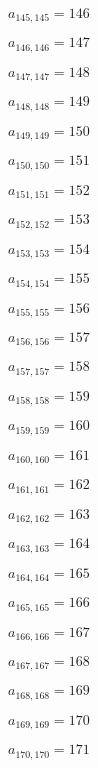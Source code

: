 \documentclass[a4paper,12pt]{article}
\begin{document}
$a _{ 145, 145 } = 146$

$a _{ 146, 146 } = 147$

$a _{ 147, 147 } = 148$

$a _{ 148, 148 } = 149$

$a _{ 149, 149 } = 150$

$a _{ 150, 150 } = 151$

$a _{ 151, 151 } = 152$

$a _{ 152, 152 } = 153$

$a _{ 153, 153 } = 154$

$a _{ 154, 154 } = 155$

$a _{ 155, 155 } = 156$

$a _{ 156, 156 } = 157$

$a _{ 157, 157 } = 158$

$a _{ 158, 158 } = 159$

$a _{ 159, 159 } = 160$

$a _{ 160, 160 } = 161$

$a _{ 161, 161 } = 162$

$a _{ 162, 162 } = 163$

$a _{ 163, 163 } = 164$

$a _{ 164, 164 } = 165$

$a _{ 165, 165 } = 166$

$a _{ 166, 166 } = 167$

$a _{ 167, 167 } = 168$

$a _{ 168, 168 } = 169$

$a _{ 169, 169 } = 170$

$a _{ 170, 170 } = 171$
\end{document}
